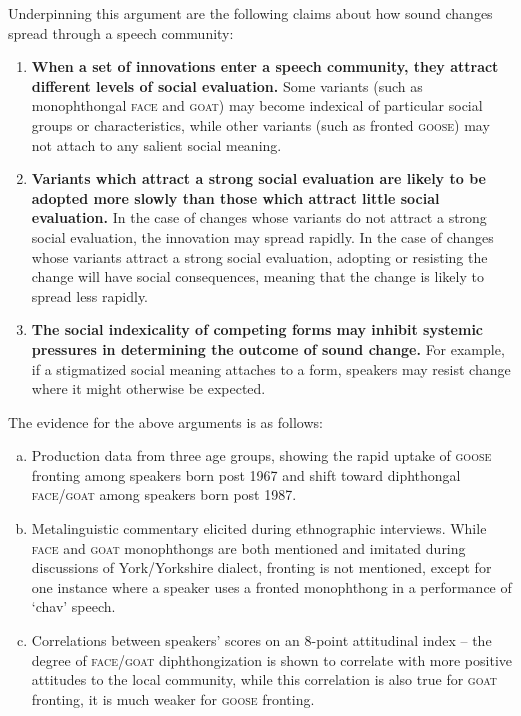 \documentclass{article}
\begin{document}
Underpinning this argument are the following claims about how sound changes spread through a speech community:

\begin{enumerate}[i]

\item{\textbf{When a set of innovations enter a speech community, they attract different levels of social evaluation.} Some variants (such as monophthongal \textsc{\textsc{face}} and \textsc{\textsc{goat}}) may become indexical of particular social groups or characteristics, while other variants (such as fronted \textsc{\textsc{goose}}) may not attach to any salient social meaning.}
\item{\textbf{Variants which attract a strong social evaluation are likely to be adopted more slowly than those which attract little social evaluation.} In the case of changes whose variants do not attract a strong social evaluation, the innovation may spread rapidly. In the case of changes whose variants attract a strong social evaluation, adopting or resisting the change will have social consequences, meaning that the change is likely to spread less rapidly.}
\item{\textbf{The social indexicality of competing forms may inhibit systemic pressures in determining the outcome of sound change.} For example, if a stigmatized social meaning attaches to a form, speakers may resist change where it might otherwise be expected.}
\end{enumerate}

The evidence for the above arguments is as follows:

\begin{enumerate}[(a)]
\item{Production data from three age groups, showing the rapid uptake of \textsc{goose} fronting among speakers born post 1967 and shift toward diphthongal \textsc{face/goat} among speakers born post 1987.}
\item{Metalinguistic commentary elicited during ethnographic interviews. While \textsc{face} and \textsc{goat} monophthongs are both mentioned and imitated during discussions of York/Yorkshire dialect, fronting is not mentioned, except for one instance where a speaker uses a fronted monophthong in a performance of `chav' speech.}

\item{Correlations between speakers' scores on an 8-point attitudinal index -- the degree of \textsc{face}/\textsc{goat} diphthongization is shown to correlate with more positive attitudes to the local community, while this correlation is also true for \textsc{goat} fronting, it is much weaker for \textsc{goose} fronting.}

\end{enumerate}
\end{document}
